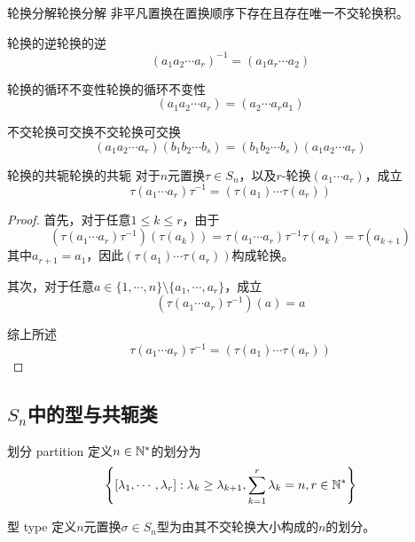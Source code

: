 \begin{lemma}{轮换分解}{轮换分解}
	非平凡置换在置换顺序下存在且存在唯一不交轮换积。
\end{lemma}

\begin{lemma}{轮换的逆}{轮换的逆}
	$$
	(a_1a_2\cdots a_r)^{-1}=(a_1a_r\cdots a_2)
	$$
\end{lemma}

\begin{lemma}{轮换的循环不变性}{轮换的循环不变性}
	$$
	(a_1a_2\cdots a_r)=(a_2\cdots a_ra_1)
	$$
\end{lemma}

\begin{lemma}{不交轮换可交换}{不交轮换可交换}
	$$
	(a_1a_2\cdots a_r)(b_1b_2\cdots b_s)=(b_1b_2\cdots b_s)(a_1a_2\cdots a_r)
	$$
\end{lemma}

\begin{lemma}{轮换的共轭}{轮换的共轭}
	对于$n$元置换$\tau\in S_n$，以及$r$-轮换$(a_1\cdots a_r)$，成立
	$$
	\tau(a_1\cdots a_r)\tau^{-1}=(\tau(a_1)\cdots \tau(a_r))
	$$
\end{lemma}

\begin{proof}
	首先，对于任意$1\le k\le r$，由于
	$$
	(\tau(a_1\cdots a_r)\tau^{-1})(\tau(a_k))
	=\tau(a_1\cdots a_r)\tau^{-1}\tau(a_k)
	=\tau(a_{k+1})
	$$
	其中$a_{r+1}=a_1$，因此$(\tau(a_1)\cdots \tau(a_r))$构成轮换。
	
	其次，对于任意$a\in\{ 1,\cdots,n \}\setminus\{ a_1,\cdots,a_r \}$，成立
	$$
	(\tau(a_1\cdots a_r)\tau^{-1})(a)=a
	$$
	
	综上所述
	$$
	\tau(a_1\cdots a_r)\tau^{-1}=(\tau(a_1)\cdots \tau(a_r))
	$$
\end{proof}

\subsection{$S_n$中的型与共轭类}

\begin{definition}{划分 partition}
	定义$n\in\mathbb{N}^*$的划分为
	$$
	\left\{ [\lambda_1,\cdots,\lambda_r]:\lambda_{k}\ge\lambda_{k+1},\sum_{k=1}^{r}\lambda_k=n,r\in\mathbb{N}^* \right\}
	$$
\end{definition}

\begin{definition}{型 type}
	定义$n$元置换$\sigma\in S_n$型为由其不交轮换大小构成的$n$的划分。
\end{definition}

